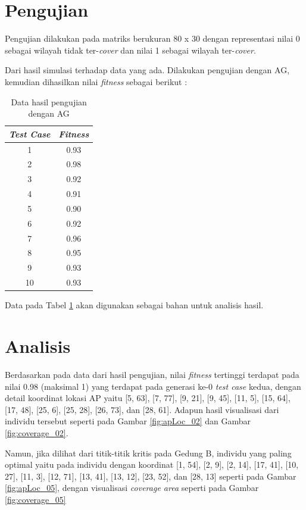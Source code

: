 \documentclass[12pt,a4paper]{report}
\begin{document}
		\section{Pengujian}
		Pengujian dilakukan pada matriks berukuran 80 x 30 dengan representasi nilai 0 sebagai wilayah tidak ter-\emph{cover} dan nilai 1 sebagai wilayah ter-\emph{cover}.
		
		Dari hasil simulasi terhadap data yang ada. Dilakukan pengujian dengan AG, kemudian dihasilkan nilai \emph{fitness} sebagai berikut :

		\begin{table}[h]
			\centering
			\begin{tabular}{|c|c|}
				\hline \textbf{\emph{Test Case}} & \textbf{\emph{Fitness}} \\ 
				\hline 1 & 0.93 \\ 
				\hline 2 & 0.98 \\ 
				\hline 3 & 0.92 \\ 
				\hline 4 & 0.91 \\ 
				\hline 5 & 0.90 \\ 
				\hline 6 & 0.92 \\ 
				\hline 7 & 0.96 \\ 
				\hline 8 & 0.95 \\ 
				\hline 9 & 0.93 \\ 
				\hline 10 & 0.93 \\ 
				\hline 
			\end{tabular}
			\caption{Data hasil pengujian dengan AG}
			\label{tab:1}
		\end{table}
		Data pada Tabel \ref{tab:1} akan digunakan sebagai bahan untuk analisis hasil.
		\section{Analisis}
		Berdasarkan pada data dari hasil pengujian, nilai \emph{fitness} tertinggi terdapat pada nilai 0.98 (maksimal 1) yang terdapat pada generasi ke-0 \emph{test case} kedua, dengan detail koordinat lokasi AP yaitu [5, 63], [7, 77], [9, 21], [9, 45], [11, 5], [15, 64], [17, 48], [25, 6], [25, 28], [26, 73], dan [28, 61]. Adapun hasil visualisasi dari individu tersebut seperti pada Gambar \ref{fig:apLoc_02} dan Gambar \ref{fig:coverage_02}.
		
		Namun, jika dilihat dari titik-titik kritis pada Gedung B, individu yang paling optimal yaitu pada individu dengan koordinat [1, 54], [2, 9], [2, 14], [17, 41], [10, 27], [11, 3], [12, 71], [13, 41], [13, 12], [23, 52], dan [28, 13] seperti pada Gambar \ref{fig:apLoc_05}, dengan visualisasi \emph{coverage area} seperti pada Gambar \ref{fig:coverage_05}
		
\end{document}
